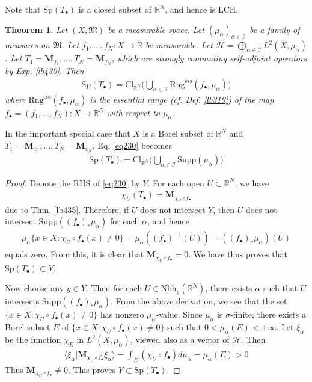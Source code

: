 \documentclass[12pt,b5paper,notitlepage]{article}
\theoremstyle{definition}
\theoremstyle{plain}
\newtheorem{thm}[df]{Theorem}
\newcommand{\fk}{\mathfrak}
\newcommand{\bk}[1]{\langle {#1}\rangle}
\newcommand{\blt}{\bullet}
\newcommand{\Rbb}{\mathbb R}
\newcommand{\Sp}{\mathrm{Sp}}
\newcommand{\Supp}{\mathrm{Supp}}
\newcommand{\Nbh}{\mathrm{Nbh}}
\newcommand{\Cl}{\mathrm{Cl}}
\newcommand{\Ess}{\mathrm{Rng}^{\mathrm{ess}}}
\newcommand{\MH}{\mathcal H}
\newcommand{\SI}{\mathscr I}
\newcommand{\Mbf}{\mathbf M}
\numberwithin{equation}{section}
\begin{document}
Note that $\Sp(T_\blt)$ is a closed subset of $\Rbb^N$, and hence is LCH.

\begin{thm}\label{lb441}
Let $(X,\fk M)$ be a measurable space. Let $(\mu_\alpha)_{\alpha\in\SI}$ be a family of  measures on $\fk M$. Let $f_1,\dots,f_N:X\rightarrow\Rbb$ be measurable. Let $\MH=\bigoplus_{\alpha\in\SI}L^2(X,\mu_\alpha)$. Let $T_1=\Mbf_{f_1},\dots,T_N=\Mbf_{f_N}$, which are strongly commuting self-adjoint operators by Exp. \ref{lb430}. Then
\begin{align}\label{eq230}
\Sp(T_\blt)= \Cl_{\Rbb^N}\Big(\bigcup_{\alpha\in\SI}\Ess(f_\blt,\mu_\alpha)\Big)
\end{align}
where $\Ess(f_\blt,\mu_\alpha)$ is the essential range (cf. Def. \ref{lb319}) of the map $f_\blt=(f_1,\dots,f_N):X\rightarrow\Rbb^N$ with respect to $\mu_\alpha$.
\end{thm}

In the important special case that $X$ is a Borel subset of $\Rbb^N$ and $T_1=\Mbf_{x_1},\dots,T_N=\Mbf_{x_N}$, Eq. \eqref{eq230} becomes
\begin{align}\label{eq231}
\Sp(T_\blt)=\Cl_{\Rbb^N}\Big(\bigcup_{\alpha\in\SI}\Supp(\mu_\alpha)\Big)
\end{align}


\begin{proof}
Denote the RHS of \eqref{eq230} by $Y$. For each open $U\subset\Rbb^N$, we have
\begin{align*}
\chi_U(T_\blt)=\Mbf_{\chi_U\circ f_\blt}
\end{align*}
due to Thm. \ref{lb435}. Therefore, if $U$ does not intersect $Y$, then $U$ does not intersect $\Supp((f_\blt)_*\mu_\alpha)$ for each $\alpha$, and hence
\begin{align*}
\mu_\alpha\{x\in X:\chi_U\circ f_\blt(x)\neq0\}=\mu_\alpha((f_\blt)^{-1}(U))=((f_\blt)_*\mu_\alpha)(U)
\end{align*}
equals zero. From this, it is clear that $\Mbf_{\chi_U\circ f_\blt}=0$. We have thus proves that $\Sp(T_\blt)\subset Y$.

Now choose any $y\in Y$. Then for each $U\in\Nbh_y(\Rbb^N)$, there exists $\alpha$ such that $U$ intersects $\Supp((f_\blt)_*\mu_\alpha)$. From the above derivation, we see that the set $\{x\in X:\chi_U\circ f_\blt(x)\neq0\}$ has nonzero $\mu_\alpha$-value. Since $\mu_\alpha$ is $\sigma$-finite, there exists a Borel subset $E$ of $\{x\in X:\chi_U\circ f_\blt(x)\neq0\}$ such that $0<\mu_\alpha(E)<+\infty$. Let $\xi_\alpha$ be the function $\chi_E$ in $L^2(X,\mu_\alpha)$, viewed also as a vector of $\MH$. Then
\begin{align*}
\bk{\xi_\alpha|\Mbf_{\chi_{U}\circ f_\blt}\xi_\alpha}=\int_E (\chi_U\circ f_\blt) d\mu_\alpha=\mu_\alpha(E)>0
\end{align*}
Thus $\Mbf_{\chi_U\circ f_\blt}\neq0$. This proves $Y\subset\Sp(T_\blt)$.
\end{proof}
\end{document}
